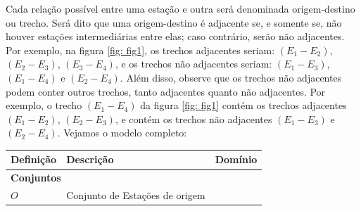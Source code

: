 Cada relação possível entre uma estação e outra será denominada origem-destino ou trecho. Será dito que uma origem-destino é adjacente se, e somente se, não houver estações intermediárias entre elas; caso contrário, serão não adjacentes. Por exemplo, na figura \ref{fig: fig1}, os trechos adjacentes seriam: $(E_1-E_2)$, $(E_2-E_3)$, $(E_3-E_4)$, e os trechos não adjacentes seriam: $(E_1-E_3)$, $(E_1-E_4)$ e $(E_2-E_4)$. Além disso, observe que os trechos não adjacentes podem conter outros trechos, tanto adjacentes quanto não adjacentes. Por exemplo, o trecho $(E_1-E_4)$ da figura \ref{fig: fig1} contém os trechos adjacentes $(E_1-E_2)$, $(E_2-E_3)$, e contém os trechos não adjacentes $(E_1-E_3)$ e $(E_2-E_4)$. Vejamos o modelo completo:


\begin{table}[H]
	\centering
	\small
	\begin{tabular}{p{2cm} p{9.5cm} p{3.2cm}}
		\toprule
		\textbf{Definição} & \textbf{Descrição}                                                                                                                                                                                                                                                                                                                                                                                                            & \textbf{Domínio}                             \\ \midrule
		\multicolumn{3}{l}{\textbf{Conjuntos}}                                                                                                                                                                                                                                                                                                                                                                                                                                                            \\ \midrule
		$O$                & Conjunto de Estações de origem                                                                                                                                                                                                                                                                                                                                                                                                &                                              \\

\end{tabular}
\end{table}
